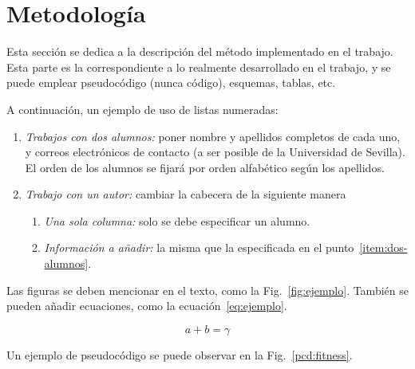 \documentclass[conference,a4paper]{IEEEtran}
\def\figurename{Fig.}
\begin{document}
\section{Metodología}

Esta sección se dedica a la descripción del método implementado en el trabajo.
Esta parte es la correspondiente a lo realmente desarrollado en el trabajo, y
se puede emplear pseudocódigo (nunca código), esquemas, tablas, etc.

A continuación, un ejemplo de uso de listas numeradas:
\begin{enumerate}
\item\label{item:dos-alumnos} \textit{Trabajos con dos alumnos:} poner nombre y
  apellidos completos de cada uno, y correos electrónicos de contacto (a ser
  posible de la Universidad de Sevilla). El orden de los alumnos se fijará por
  orden alfabético según los apellidos.
\item \textit{Trabajo con un autor:} cambiar la cabecera de la siguiente manera
  \begin{enumerate}
  \item \textit{Una sola columna:} solo se debe especificar un alumno.
  \item \textit{Información a añadir:} la misma que la especificada en el
    punto~\ref{item:dos-alumnos}.
  \end{enumerate}
\end{enumerate}

Las figuras se deben mencionar en el texto, como la
\figurename~\ref{fig:ejemplo}. También se pueden añadir ecuaciones, como la
ecuación~\eqref{eq:ejemplo}.

\begin{equation}
  \label{eq:ejemplo}
  a + b = \gamma
\end{equation}

Un ejemplo de pseudocódigo se puede observar en la
\figurename~\ref{pcd:fitness}.
\end{document}
